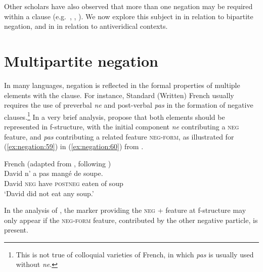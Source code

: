 \documentclass[output=paper,hidelinks]{langscibook}
\begin{document}
\ea \label{ex:negation:46} 
\z   

Other scholars have also observed that more than one negation may be required within a clause (e.g.\ \citealt {ButtEtAl1999}, \citealt {sellsneg}, \citealt {Laczko14}). We now explore this subject in  in relation to bipartite negation, and in  in relation to antiveridical contexts.


\section{Multipartite negation}
\label{sec:negation:mapping}

In many languages, negation is reflected in the formal properties of multiple elements with the clause. For instance, Standard (Written) French usually requires the use of preverbal \emph{ne} and post-verbal \emph{pas} in the formation of negative clauses.\footnote{This is not true of colloquial varieties of French, in which \emph{pas} is usually used without \emph{ne}.} In a very brief analysis, \citet [142--143]{ButtEtAl1999} propose that both elements should be represented in f-structure, with the initial component \emph{ne} contributing a \textsc{neg} feature, and \emph{pas} contributing a related feature \textsc{neg-form}, as illustrated for (\ref{ex:negation:59}) in (\ref{ex:negation:60}) from \citet [67]{DLM:LFG}. 

\ea French (adapted from \citealt [143]{ButtEtAl1999}, following \citealt [67]{DLM:LFG})\\
\label{ex:negation:59} 
\gll David n' a pas mangé de soupe.\\
David \textsc{neg} have \textsc{postneg} eaten of soup\\
\glt `David did not eat any soup.'
\z

\ea \label{ex:negation:60} 
\z   
In the analysis of \citet [142--143]{ButtEtAl1999}, the marker providing  the \textsc{neg} + feature at f-structure may only appear if the \textsc{neg-form} feature, contributed by the other negative particle, is present. 
\end{document}
